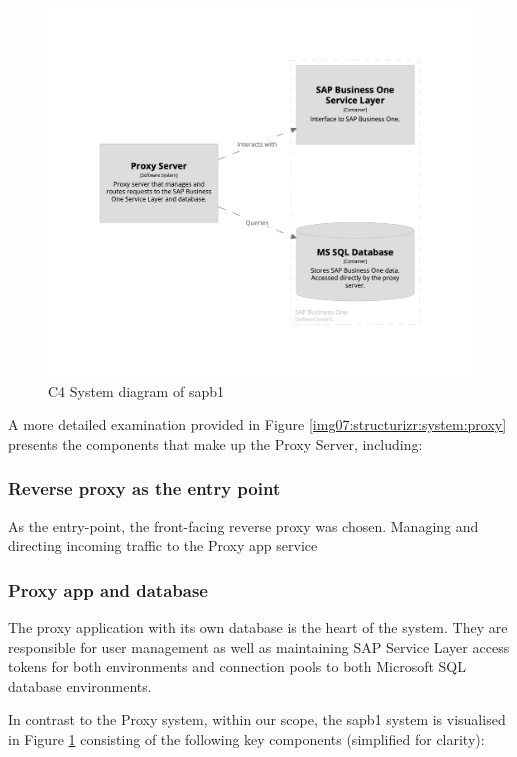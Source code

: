 \begin{figure}[H]\centering
\includegraphics[width=140mm]{img/chap07/fig_structurizr-sap-system.png}
\caption{C4 System diagram of \gls{sapb1}}
\label{img07:structurizr:system:sap}
\end{figure}

A more detailed examination provided in Figure \ref{img07:structurizr:system:proxy} presents the components that make up the Proxy Server, including:

\subsubsection{Reverse proxy as the entry point}
As the entry-point, the front-facing reverse proxy was chosen.
Managing and directing incoming traffic to the Proxy app service

\subsubsection{Proxy app and database}
The proxy application with its own database is the heart of the system.
They are responsible for user management as well as maintaining SAP Service Layer access tokens for both environments and connection pools to both Microsoft SQL database environments.

In contrast to the Proxy system, within our scope, the \gls{sapb1} system is visualised in Figure \ref{img07:structurizr:system:sap} consisting of the following key components (simplified for clarity):
 
